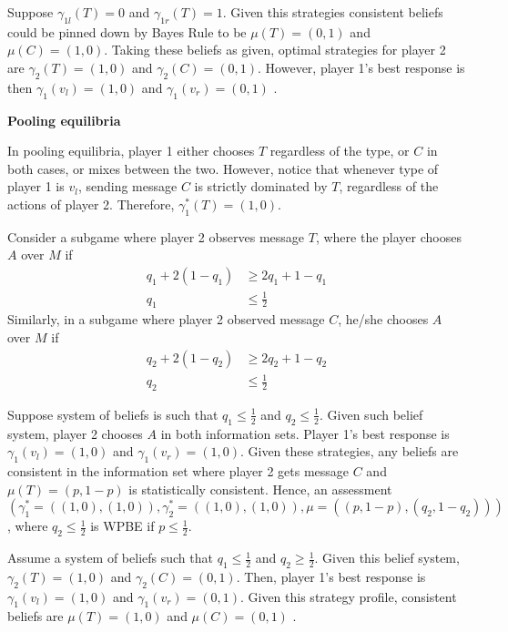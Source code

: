 \documentclass[]{article}
\begin{document}
Suppose $\gamma_{1l}(T) = 0$ and $\gamma_{1r}(T) = 1$. Given this strategies consistent beliefs could be pinned down by Bayes Rule to be $\mu(T) = (0, 1)$ and $\mu(C) = (1, 0)$. Taking these beliefs as given, optimal strategies for player 2 are $\gamma_2(T) = (1, 0)$ and $\gamma_2(C) = (0, 1)$. However, player 1's best response is then $\gamma_1(v_l) = (1, 0)$ and $\gamma_1(v_r) = (0, 1)$ \Lightning.

\textbf{Pooling equilibria}

In pooling equilibria, player 1 either chooses $T$ regardless of the type, or $C$ in both cases, or mixes between the two. However, notice that whenever type of player 1 is $v_l$, sending message $C$ is strictly dominated by $T$, regardless of the actions of player 2. Therefore, $\gamma_1^*(T) = (1, 0)$. 

Consider a subgame where player 2 observes message $T$, where the player chooses $A$ over $M$ if
\begin{equation}
	\begin{split}
		q_1 + 2(1 - q_1) &\geq 2q_1 + 1 - q_1 \\\nonumber
		q_1 &\leq \frac{1}{2}
	\end{split}
\end{equation}
Similarly, in a subgame where player 2 observed message $C$, he/she chooses $A$ over $M$ if
\begin{equation}
	\begin{split}
		q_2 + 2(1 - q_2) &\geq 2q_2 + 1 - q_2 \\ \nonumber
		q_2 &\leq \frac{1}{2}
	\end{split}
\end{equation}

Suppose system of beliefs is such that $q_1 \leq \frac{1}{2}$ and $q_2 \leq \frac{1}{2}$. Given such belief system, player 2 chooses $A$ in both information sets. Player 1's best response is $\gamma_1(v_l) = (1, 0)$ and $\gamma_1(v_r) = (1, 0)$. Given these strategies, any beliefs are consistent in the information set where player 2 gets message $C$ and $\mu(T) = (p, 1 - p)$ is statistically consistent. Hence, an assessment $(\gamma_1^* = ((1,0), (1, 0)), \gamma_2^* = ((1, 0), (1, 0)), \mu = ((p, 1 - p), (q_2, 1 - q_2)))$, where $q_2\leq\frac{1}{2}$ is WPBE if $p\leq\frac{1}{2}$.

Assume a system of beliefs such that $q_1 \leq \frac{1}{2}$ and $q_2 \geq \frac{1}{2}$. Given this belief system, $\gamma_2(T) = (1, 0)$ and $\gamma_2(C) = (0, 1)$. Then, player 1's best response is $\gamma_1(v_l) = (1, 0)$ and $\gamma_1(v_r) = (0, 1)$. Given this strategy profile, consistent beliefs are $\mu(T) = (1, 0)$ and $\mu(C) = (0, 1)$ \Lightning.
\end{document}
